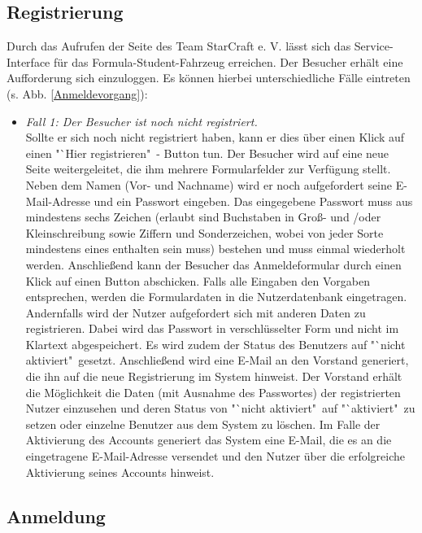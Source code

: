 \documentclass[fontsize = 12pt, paper = a4]{scrreprt}
\begin{document}
\newpage

\subsection{Registrierung}

Durch das Aufrufen der Seite des Team StarCraft e. V. lässt sich das Service-Interface für das Formula-Student-Fahrzeug erreichen. Der Besucher erhält eine Aufforderung sich einzuloggen. Es können hierbei unterschiedliche Fälle eintreten (s. Abb. \ref{Anmeldevorgang}): 

\begin{itemize}

\item \textit{Fall 1: Der Besucher ist noch nicht registriert.} \\
Sollte er sich noch nicht registriert haben, kann er dies über einen Klick auf einen "`Hier registrieren"\ - Button tun. Der Besucher wird auf eine neue Seite weitergeleitet, die ihm mehrere Formularfelder zur Verfügung stellt. Neben dem Namen (Vor- und Nachname) wird er noch aufgefordert seine E-Mail-Adresse und ein Passwort eingeben. Das eingegebene Passwort muss aus mindestens sechs Zeichen (erlaubt sind Buchstaben in Groß- und /oder Kleinschreibung sowie Ziffern und Sonderzeichen, wobei von jeder Sorte mindestens eines enthalten sein muss) bestehen und muss einmal wiederholt werden. Anschließend kann der Besucher das Anmeldeformular durch einen Klick auf einen Button abschicken. Falls alle Eingaben den Vorgaben entsprechen, werden die Formulardaten in die Nutzerdatenbank eingetragen. Andernfalls wird der Nutzer aufgefordert sich mit anderen Daten zu registrieren. Dabei wird das Passwort in verschlüsselter Form und nicht im Klartext abgespeichert. Es wird zudem der Status des Benutzers auf "`nicht aktiviert"\ gesetzt. Anschließend wird eine E-Mail an den Vorstand generiert, die ihn auf die neue Registrierung im System hinweist. Der Vorstand erhält die Möglichkeit die Daten (mit Ausnahme des Passwortes) der registrierten Nutzer einzusehen und deren Status von "`nicht aktiviert"\ auf "`aktiviert"\ zu setzen oder einzelne Benutzer aus dem System zu löschen. Im Falle der Aktivierung des Accounts generiert das System eine E-Mail, die es an die eingetragene E-Mail-Adresse versendet und den Nutzer über die erfolgreiche Aktivierung seines Accounts hinweist.

\end{itemize}

\subsection{Anmeldung}
\end{document}
